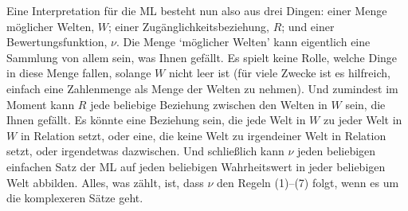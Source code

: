 Eine Interpretation für die ML besteht nun also aus drei Dingen: einer Menge möglicher Welten, $W$; einer Zugänglichkeitsbeziehung, $R$; und einer Bewertungsfunktion, $\nu$. Die Menge `möglicher Welten' kann eigentlich eine Sammlung von allem sein, was Ihnen gefällt. Es spielt keine Rolle, welche Dinge in diese Menge fallen, solange $W$ nicht leer ist (für viele Zwecke ist es hilfreich, einfach eine Zahlenmenge als Menge der Welten zu nehmen). Und zumindest im Moment kann $R$ jede beliebige Beziehung zwischen den Welten in $W$ sein, die Ihnen gefällt. Es könnte eine Beziehung sein, die jede Welt in $W$ zu jeder Welt in $W$ in Relation setzt, oder eine, die keine Welt zu irgendeiner Welt in Relation setzt, oder irgendetwas dazwischen. Und schließlich kann $\nu$ jeden beliebigen einfachen Satz der ML auf jeden beliebigen Wahrheitswert in jeder beliebigen Welt abbilden. Alles, was zählt, ist, dass $\nu$ den Regeln (1)--(7) folgt, wenn es um die komplexeren Sätze geht.

